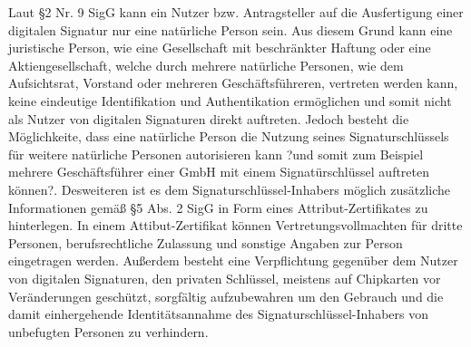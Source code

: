 Laut \S 2 Nr. 9 SigG kann ein Nutzer bzw. Antragsteller auf die Ausfertigung einer digitalen Signatur nur eine natürliche Person sein. Aus diesem Grund kann eine juristische Person, wie eine Gesellschaft mit beschränkter Haftung oder eine Aktiengesellschaft, welche durch mehrere natürliche Personen, wie dem Aufsichtsrat, Vorstand oder mehreren Geschäftsführeren, vertreten werden kann, keine eindeutige Identifikation und Authentikation ermöglichen und somit nicht als Nutzer von digitalen Signaturen direkt auftreten. Jedoch besteht die Möglichkeite, dass eine natürliche Person die Nutzung seines Signaturschlüssels für weitere natürliche Personen autorisieren kann ?und somit zum Beispiel mehrere Geschäftsführer einer GmbH mit einem Signatürschlüssel auftreten können?. Desweiteren ist es dem Signaturschlüssel-Inhabers möglich zusätzliche Informationen gemäß \S 5 Abs. 2 SigG in Form eines Attribut-Zertifikates zu hinterlegen. In einem Attibut-Zertifikat können Vertretungsvollmachten für dritte Personen, berufsrechtliche Zulassung und sonstige Angaben zur Person eingetragen werden. Außerdem besteht eine Verpflichtung gegenüber dem Nutzer von digitalen Signaturen, den privaten Schlüssel, meistens auf Chipkarten vor Veränderungen geschützt, sorgfältig aufzubewahren um den Gebrauch und die damit einhergehende Identitätsannahme des Signaturschlüssel-Inhabers von unbefugten Personen zu verhindern. \cite{standdeswissens3}\cite{standdeswissens4}